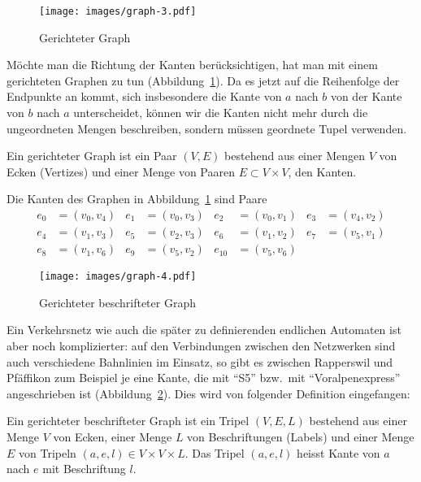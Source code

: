 \begin{figure}
\begin{center}
\texttt{[image: images/graph-3.pdf]}
\end{center}
\caption{Gerichteter Graph\label{grundlagen:gerichtetergraph}}
\end{figure}
Möchte man die Richtung der Kanten berücksichtigen,
hat man mit einem gerichteten
Graphen zu tun (Abbildung~\ref{grundlagen:gerichtetergraph}).
Da es jetzt auf die Reihenfolge der Endpunkte an kommt,
sich insbesondere die Kante von $a$ nach $b$ von der Kante von $b$ nach
$a$ unterscheidet, können wir die Kanten nicht mehr durch die ungeordneten
Mengen beschreiben, sondern müssen geordnete Tupel verwenden.

\begin{definition}
%
\label{def_gerichteter_graph}
Ein gerichteter Graph ist ein Paar $(V,E)$ bestehend aus einer
Mengen $V$ von Ecken (Vertizes) und einer Menge von Paaren $E\subset V\times V$,
den Kanten.
\end{definition}

Die Kanten des Graphen in Abbildung~\ref{grundlagen:gerichtetergraph}
sind Paare
\begin{align*}
e_0&=(v_0,v_4)
&
e_1&=(v_0,v_3)
&
e_2&=(v_0,v_1)
&
e_3&=(v_4,v_2)
\\
e_4&=(v_1,v_3)
&
e_5&=(v_2,v_3)
&
e_6&=(v_1,v_2)
&
e_7&=(v_5,v_1)
\\
e_8&=(v_1,v_6)
&
e_9&=(v_5,v_2)
&
e_{10}&=(v_5,v_6)
\end{align*}

\begin{figure}
\begin{center}
\texttt{[image: images/graph-4.pdf]}
\end{center}
\caption{Gerichteter beschrifteter Graph\label{grundlagen:beschrgraph}}
\end{figure}
Ein Verkehrsnetz wie auch die später zu definierenden endlichen
Automaten ist aber noch komplizierter: auf den Verbindungen zwischen
den Netzwerken sind auch verschiedene Bahnlinien im Einsatz, so gibt
es zwischen Rapperswil und Pfäffikon zum Beispiel je eine Kante, die
mit ``S5'' bzw.~mit ``Voralpenexpress'' angeschrieben ist
(Abbildung~\ref{grundlagen:beschrgraph}). Dies
wird von folgender Definition eingefangen:

\begin{definition}
\label{def_gerichteter_beschrifteter_graph}
%
Ein gerichteter beschrifteter Graph ist ein Tripel $(V,E,L)$ bestehend
aus einer Menge $V$ von Ecken, einer Menge $L$ von Beschriftungen (Labels) und 
einer Menge $E$ von Tripeln $(a,e,l)\in V\times V\times L$. Das
Tripel $(a,e,l)$ heisst Kante von $a$ nach $e$ mit Beschriftung $l$.
\end{definition}

